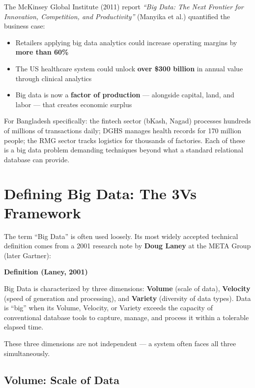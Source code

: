 \documentclass[12pt,a4paper]{article}
\newcommand{\defbox}[2]{%
  \noindent
  \colorbox{PUNavy!12}{%
    \begin{minipage}{\dimexpr\linewidth-2\fboxsep}
      \vspace{4pt}
      \textbf{\textcolor{PUNavy}{#1}}\par\vspace{2pt}
      #2
      \vspace{4pt}
    \end{minipage}%
  }\par\vspace{6pt}%
}
\begin{document}
The McKinsey Global Institute (2011) report \textit{``Big Data: The Next Frontier for Innovation, Competition, and Productivity''} (Manyika et al.) quantified the business case:
\begin{itemize}[leftmargin=1.8em]
  \item Retailers applying big data analytics could increase operating margins by \textbf{more than 60\%}
  \item The US healthcare system could unlock \textbf{over \$300 billion} in annual value through clinical analytics
  \item Big data is now a \textbf{factor of production} — alongside capital, land, and labor — that creates economic surplus
\end{itemize}

For Bangladesh specifically: the fintech sector (bKash, Nagad) processes hundreds of millions of transactions daily; DGHS manages health records for 170 million people; the RMG sector tracks logistics for thousands of factories. Each of these is a big data problem demanding techniques beyond what a standard relational database can provide.

\section{Defining Big Data: The 3Vs Framework}

The term ``Big Data'' is often used loosely. Its most widely accepted technical definition comes from a 2001 research note by \textbf{Doug Laney} at the META Group (later Gartner):

\defbox{Definition (Laney, 2001)}{Big Data is characterized by three dimensions:\newline
\textbf{Volume} (scale of data), \textbf{Velocity} (speed of generation and processing), and \textbf{Variety} (diversity of data types). Data is ``big'' when its Volume, Velocity, or Variety exceeds the capacity of conventional database tools to capture, manage, and process it within a tolerable elapsed time.}

These three dimensions are not independent — a system often faces all three simultaneously.

\subsection{Volume: Scale of Data}
\end{document}

